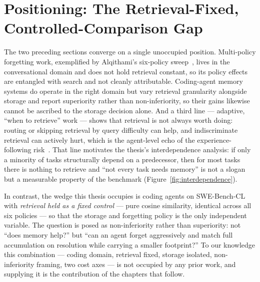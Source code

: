 

\section{Positioning: The Retrieval-Fixed, Controlled-Comparison Gap}

The two preceding sections converge on a single unoccupied position. Multi-policy forgetting
work, exemplified by Alqithami's six-policy sweep~\cite{alqithami2025}, lives in the
conversational domain and does not hold retrieval constant, so its policy effects are
entangled with search and not cleanly attributable. Coding-agent memory systems do operate
in the right domain but vary retrieval granularity alongside storage and report superiority
rather than non-inferiority, so their gains likewise cannot be ascribed to the storage
decision alone. And a third line --- adaptive, ``when to retrieve'' work --- shows that
retrieval is not always worth doing: routing or skipping retrieval by query difficulty can
help, and indiscriminate retrieval can actively hurt, which is the agent-level echo of the
experience-following risk~\cite{xiong2025}. That line motivates the thesis's interdependence
analysis: if only a minority of tasks structurally depend on a predecessor, then for most
tasks there is nothing to retrieve and ``not every task needs memory'' is not a slogan but a
measurable property of the benchmark (Figure~\ref{fig:interdependence}).

In contrast, the wedge this thesis occupies is coding agents on SWE-Bench-CL with
\emph{retrieval held as a fixed control} --- pure cosine similarity, identical across all
six policies --- so that the storage and forgetting policy is the only independent variable.
The question is posed as non-inferiority rather than superiority: not ``does memory help?''
but ``can an agent forget aggressively and match full accumulation on resolution while
carrying a smaller footprint?'' To our knowledge this combination --- coding domain,
retrieval fixed, storage isolated, non-inferiority framing, two cost axes --- is not
occupied by any prior work, and supplying it is the contribution of the chapters that
follow.
